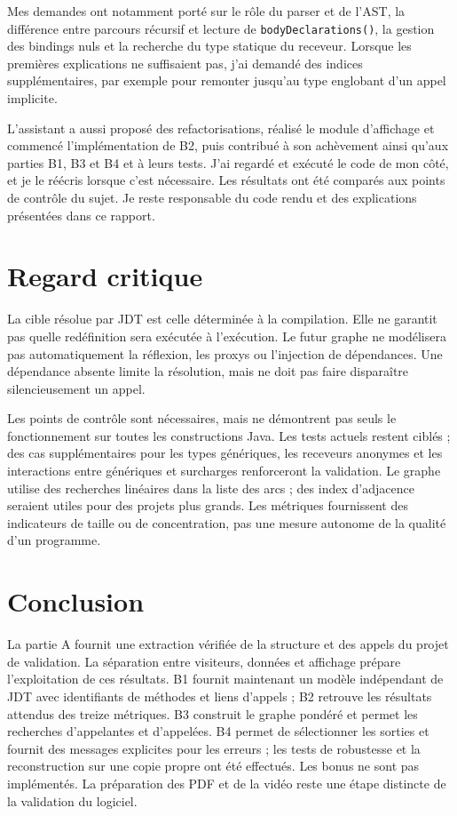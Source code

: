 \documentclass[11pt,a4paper]{article}
\newcommand{\code}[1]{\texttt{#1}}
\begin{document}
Mes demandes ont notamment porté sur le rôle du parser et de l'AST, la différence entre parcours récursif et lecture de \code{bodyDeclarations()}, la gestion des bindings nuls et la recherche du type statique du receveur. Lorsque les premières explications ne suffisaient pas, j'ai demandé des indices supplémentaires, par exemple pour remonter jusqu'au type englobant d'un appel implicite.

L'assistant a aussi proposé des refactorisations, réalisé le module d'affichage et commencé l'implémentation de B2, puis contribué à son achèvement ainsi qu'aux parties B1, B3 et B4 et à leurs tests. J'ai regardé et exécuté le code de mon côté, et je le réécris lorsque c'est nécessaire. Les résultats ont été comparés aux points de contrôle du sujet. Je reste responsable du code rendu et des explications présentées dans ce rapport.

\section{Regard critique}
La cible résolue par JDT est celle déterminée à la compilation. Elle ne garantit pas quelle redéfinition sera exécutée à l'exécution. Le futur graphe ne modélisera pas automatiquement la réflexion, les proxys ou l'injection de dépendances. Une dépendance absente limite la résolution, mais ne doit pas faire disparaître silencieusement un appel.

Les points de contrôle sont nécessaires, mais ne démontrent pas seuls le fonctionnement sur toutes les constructions Java. Les tests actuels restent ciblés ; des cas supplémentaires pour les types génériques, les receveurs anonymes et les interactions entre génériques et surcharges renforceront la validation. Le graphe utilise des recherches linéaires dans la liste des arcs ; des index d'adjacence seraient utiles pour des projets plus grands. Les métriques fournissent des indicateurs de taille ou de concentration, pas une mesure autonome de la qualité d'un programme.

\section{Conclusion}
La partie A fournit une extraction vérifiée de la structure et des appels du projet de validation. La séparation entre visiteurs, données et affichage prépare l'exploitation de ces résultats. B1 fournit maintenant un modèle indépendant de JDT avec identifiants de méthodes et liens d'appels ; B2 retrouve les résultats attendus des treize métriques. B3 construit le graphe pondéré et permet les recherches d'appelantes et d'appelées. B4 permet de sélectionner les sorties et fournit des messages explicites pour les erreurs ; les tests de robustesse et la reconstruction sur une copie propre ont été effectués.
Les bonus ne sont pas implémentés. La préparation des PDF et de la vidéo reste une étape distincte de la validation du logiciel.
\end{document}
